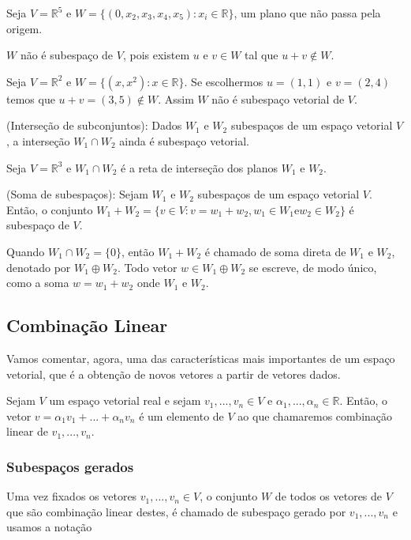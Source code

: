 \begin{ex}
	Seja $V= \mathbb{R}^{5}$ e $W=\{(0,x_{2},x_{3},x_{4},x_{5}): x_{i}\in \mathbb{R}\}$, um plano que não passa pela origem.
\end{ex}
$W$ não é subespaço de $V$, pois existem $u$ e $v\in W$ tal que $u+v\notin W$.
\begin{ex}
	Seja $V= \mathbb{R}^{2}$ e $W=\{(x,x^{2}): x\in \mathbb{R}\}$. Se escolhermos $u=(1,1)$ e $v=(2,4)$ temos que $u+v=(3,5) \notin W$. Assim $W$ não é subespaço vetorial de $V$.
\end{ex}
\begin{teo}
	(Interseção de subconjuntos): Dados $W_{1}$ e $W_{2}$ subespaços de um espaço vetorial $V$, a interseção $W_{1}\cap W_{2}$ ainda é subespaço vetorial.
\end{teo}
\begin{ex}
	Seja $V= \mathbb{R}^{3}$ e $W_{1}\cap W_{2}$ é a reta de interseção dos planos $W_{1}$ e $W_{2}$.
\end{ex}
\begin{teo}
	(Soma de subespaços): Sejam $W_{1}$ e $W_{2}$ subespaços de um espaço vetorial $V$. Então, o conjunto $W_{1}+W_{2}=\{v\in V: v=w_{1}+w_{2}, w_{1}\in W_{1} \text{e} w_{2}\in W_{2}\}$ é subespaço de $V$.
\end{teo}
Quando $W_{1}\cap W_{2}=\{0\}$, então $W_{1}+W_{2}$ é chamado de soma direta de $W_{1}$ e $W_{2}$, denotado por $W_{1}\oplus W_{2}$. Todo vetor $w\in W_{1}\oplus W_{2}$ se escreve, de modo único, como a soma $w=w_{1}+w_{2}$ onde $W_{1}$ e $W_{2}$.

\subsection{Combinação Linear} 

Vamos comentar, agora, uma das características mais importantes de um espaço vetorial, que é a obtenção de novos vetores a partir de vetores dados.
\begin{df}
Sejam $V$ um espaço vetorial real e sejam $v_{1},...,v_{n}\in V$ e $\alpha_{1},...,\alpha_{n}\in \mathbb{R}$. Então, o vetor $v=\alpha_{1}v_{1}+...+\alpha_{n}v_{n}$ é um elemento de $V$ ao que chamaremos combinação linear de $v_{1},...,v_{n}$.
\end{df}
\subsubsection{Subespaços gerados}
Uma vez fixados os vetores $v_{1},...,v_{n}\in V$, o conjunto $W$ de todos os vetores de $V$ que são combinação linear destes, é chamado de subespaço gerado por $v_{1},...,v_{n}$ e usamos a notação\\

